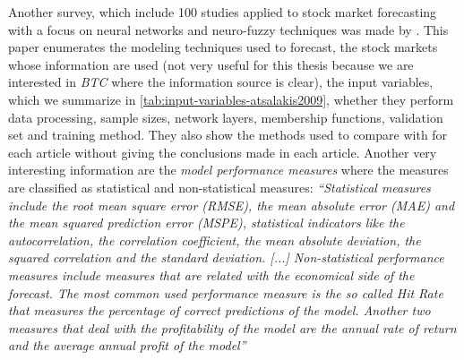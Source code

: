 Another survey, which include 100 studies applied to stock market
forecasting with a focus on neural networks and neuro-fuzzy techniques
was made by \cite{atsalakis2009surveying}. This paper enumerates the
modeling techniques used to forecast, the stock markets whose
information are used (not very useful for this thesis because we are
interested in \textit{BTC} where the information source is clear), the
input variables, which we summarize in
\autoref{tab:input-variables-atsalakis2009}, whether they perform data
processing, sample sizes, network layers, membership functions,
validation set and training method. They also show the methods used to
compare with for each article without giving the conclusions made in
each article. Another very interesting information are the
\textit{model performance measures} where the measures are classified
as statistical and non-statistical measures: \textit{``Statistical
measures include the root mean square error (RMSE), the mean absolute
error (MAE) and the mean squared prediction error (MSPE), statistical
indicators like the autocorrelation, the correlation coefficient, the
mean absolute deviation, the squared correlation and the standard
deviation. [...] Non-statistical performance measures include measures
that are related with the economical side of the forecast. The most
common used performance measure is the so called Hit Rate that
measures the percentage of correct predictions of the model. Another
two measures that deal with the profitability of the model are the
annual rate of return and the average annual profit of the model''}

